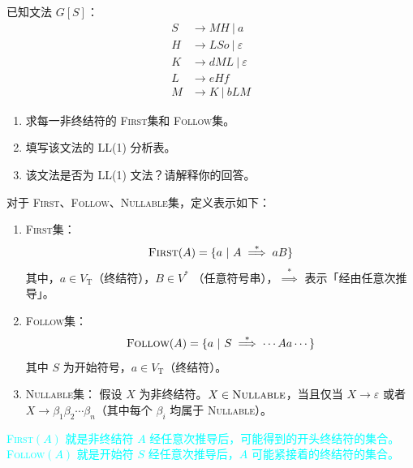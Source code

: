 \documentclass[UTF8]{ctexart}
\newcommand\FIRST{\textsc{First}}
\newcommand\FOLLOW{\textsc{Follow}}
\newcommand\NULLABLE{\textsc{Nullable}}
\newcommand\VN{V_{\mathrm{N}}} %
\newcommand\VT{V_{\mathrm{T}}} %
\newcommand\deduceone{\overset{+}{\implies}} %
\newcommand\deduce{\overset{*}{\implies}} %
\begin{document}
{\color{cyan!50!black}
已知文法 $G[S]$：
\begin{align*}
  S &\to MH \ |\  a \\
  H &\to LSo \ |\  \varepsilon \\
  K &\to dML \ |\  \varepsilon \\
  L &\to eHf \\
  M &\to K \ |\  bLM
\end{align*}
\begin{enumerate}[itemsep=0pt,parsep=0pt]
    \item 求每一非终结符的 \FIRST 集和 \FOLLOW 集。
    \item 填写该文法的 LL(1) 分析表。
    \item 该文法是否为 LL(1) 文法？请解释你的回答。
\end{enumerate}
}

\begin{tcolorbox}[colback=violet!5, colframe=violet, boxrule=1pt, ]
%

对于 \FIRST、\FOLLOW、\NULLABLE 集，定义表示如下：
\begin{enumerate}
  \item \FIRST 集：
    \begin{equation*}
      \FIRST(A) = \{a\ |\ A\deduce aB\}
    \end{equation*}
    其中，$a\in \VT$（终结符），$B \in V^*$ （任意符号串），$\deduce$ 表示「经由任意次推导」。
  \item \FOLLOW 集：
    \begin{equation*}
      \FOLLOW(A) = \{a\ |\ S\deduce \cdots Aa\cdots \}
    \end{equation*}
    其中 $S$ 为开始符号，$a\in \VT$（终结符）。
  \item \NULLABLE 集：
    假设 $X$ 为非终结符。$X\in \NULLABLE$，当且仅当 $X\to \varepsilon$ 或者 $X\to \beta_1\beta_2\cdots\beta_n$（其中每个 $\beta_i$ 均属于 \NULLABLE）。
\end{enumerate}

\textcolor{cyan}{\FIRST$(A)$ 就是非终结符 $A$ 经任意次推导后，可能得到的开头终结符的集合。\FOLLOW$(A)$ 就是开始符 $S$ 经任意次推导后，$A$ 可能紧接着的终结符的集合。}

\end{tcolorbox}
\end{document}
